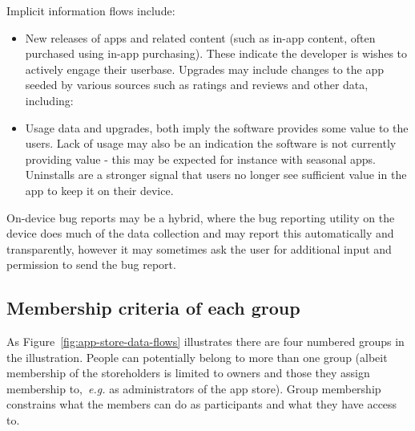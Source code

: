 Implicit information flows include:
\begin{itemize}
    \item New releases of apps and related content (such as in-app content, often purchased using in-app purchasing). These indicate the developer is wishes to actively engage their userbase. Upgrades may include changes to the app seeded by various sources such as ratings and reviews and other data, including:
    \item Usage data and upgrades, both imply the software provides some value to the users. Lack of usage may also be an indication the software is not currently providing value - this may be expected for instance with seasonal apps. Uninstalls are a stronger signal that users no longer see sufficient value in the app to keep it on their device.
\end{itemize}

On-device bug reports may be a hybrid, where the bug reporting utility on the device does much of the data collection and may report this automatically and transparently, however it may sometimes ask the user for additional input and permission to send the bug report.

\subsection{Membership criteria of each group}
As Figure~\ref{fig:app-store-data-flows} illustrates there are four numbered groups in the illustration. People can potentially belong to more than one group (albeit membership of the storeholders is limited to owners and those they assign membership to,~\emph{e.g.} as administrators of the app store). Group membership constrains what the members can do as participants and what they have access to.

